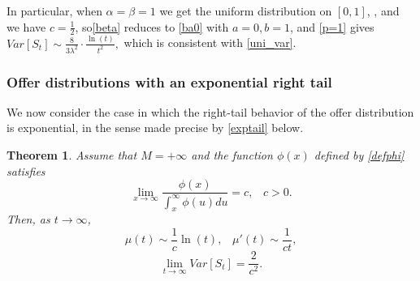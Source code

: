 \documentclass{article}
\newtheorem{thm}{Theorem}[section]
\numberwithin{equation}{section}
\begin{document}
In particular, when $\alpha=\beta=1$ we get the uniform distribution on $[0,1]$, , and we have
$c=\frac{1}{2}$, so\eqref{beta} reduces to 
\eqref{ba0} with $a=0,b=1$, and \eqref{p=1} gives
$Var[S_t]\sim \frac{8}{3\lambda^2}\cdot \frac{\ln(t)}{t^2},$
which is consistent with \eqref{uni_var}.



\subsubsection{Offer distributions with an exponential right tail}
\label{ofexp}

We now consider the case in which 
the right-tail behavior of the offer distribution is exponential, in the sense made precise by \eqref{exptail} below.

\begin{thm}\label{thm:exptail}
Assume that $M=+\infty$ and the function $\phi(x)$ defined by \eqref{defphi} satisfies 
\begin{equation}\label{exptail}
\lim_{x\rightarrow \infty} \frac{\phi(x)}{\int_{x}^\infty \phi(u)du}=c,\;\;\;c>0.
\end{equation}
Then, as $t\rightarrow \infty$,
\begin{equation}\label{expc}
\mu(t)\sim\frac{1}{c}\ln(t),\;\;\;\mu'(t)\sim \frac{1}{ct},
\end{equation}
\begin{equation}\label{expv}
\lim_{t\rightarrow \infty} Var[S_t]=\frac{2}{c^2}.
\end{equation}
\end{thm}
\end{document}
